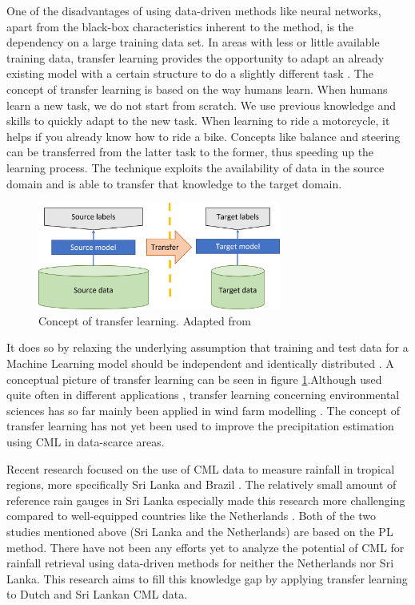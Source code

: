 \documentclass[twocolumn, 10pt, a4paper]{article}
\begin{document}
	One of the disadvantages of using data-driven methods like neural networks, apart from the black-box characteristics inherent to the method, is the dependency on a large training data set. In areas with less or little available training data, transfer learning provides the opportunity to adapt an already existing model with a certain structure to do a slightly different task \cite{TanYear}. The concept of transfer learning is based on the way humans learn. When humans learn a new task, we do not start from scratch. We use previous knowledge and skills to quickly adapt to the new task. When learning to ride a motorcycle, it helps if you already know how to ride a bike. Concepts like balance and steering can be transferred from the latter task to the former, thus speeding up the learning process. 
	The technique exploits the availability of data in the source domain and is able to transfer that knowledge to the target domain.
	\begin{figure}[t]
		\includegraphics[width=8cm]{Transfer_learning_concept}
		\caption{Concept of transfer learning. Adapted from \protect\cite{Sarkar2018} }
		\label{fig:transferconcept}
	\end{figure} 
	It does so by relaxing the underlying assumption that training and test data for a Machine Learning model should be independent and identically distributed \cite{Weiss2016}. A conceptual picture of transfer learning can be seen in figure \ref{fig:transferconcept}.Although used quite often in different applications \cite{Zhuang2021}, transfer learning concerning environmental sciences has so far mainly been applied in wind farm modelling \cite{Hu2016,Qureshi2017}. The concept of transfer learning has not yet been used to improve the precipitation estimation using CML in data-scarce areas. 
		
	Recent research focused on the use of CML data to measure rainfall in tropical regions, more specifically Sri Lanka \cite{Overeem2021} and Brazil \cite{RiosGaona2017a}. The relatively small amount of reference rain gauges in Sri Lanka especially made this research more challenging compared to well-equipped countries like the Netherlands \cite{Overeem2013}. Both of the two studies mentioned above (Sri Lanka and the Netherlands) are based on the PL method. There have not been any efforts yet to analyze the potential of CML for rainfall retrieval using data-driven methods for neither the Netherlands nor Sri Lanka. This research aims to fill this knowledge gap by applying transfer learning to Dutch and Sri Lankan CML data.
\end{document}
